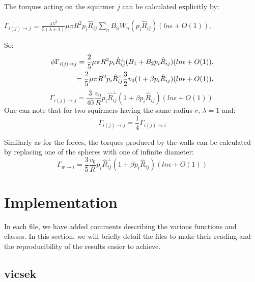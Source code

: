 \documentclass{article}
\begin{document}
The torques acting on the squirmer $j$ can be calculated explicitly by:
\begin{center}
    $\Gamma_{i(j)\rightarrow j}$ = $\frac{4 \lambda^2}{5(\lambda +1)} \mu \pi R^2 p_i\hat{R}_{ij}^{\perp}\sum_{n} B_n W_n(p_i\hat{R}_{ij}) (ln \epsilon + O(1))$.    
\end{center}
So:
\begin{align*}
    \footnotesize
    \phi \Gamma_{i(j)\rightarrow j} = \frac{2}{5}\mu\pi R^2p_i\hat{R}_{ij}^{\perp}(B_1 + B_2 p_i\hat{R}_{ij})(ln \epsilon + O(1)),\\
    = \frac{2}{5}\mu\pi R^2p_i\hat{R}_{ij}^{\perp}\frac{3}{2}v_0(1 + \beta p_i\hat{R}_{ij})(ln \epsilon + O(1)).
\end{align*}
\begin{equation*}
    \boxed{\Gamma_{i(j)\rightarrow j} = \frac{3}{40}\frac{v_0}{R}p_i\hat{R}_{ij}^{\perp}(1 + \beta p_i\hat{R}_{ij})(ln \epsilon + O(1))}.
\end{equation*}
One can note that for two squirmers having the same radius $r$, $\lambda = 1$ and:
$$\Gamma_{i(j)\rightarrow j} = \frac{1}{4}\Gamma_{i(j)\rightarrow i}$$

Similarly as for the forces, the torques produced by the walls can be calculated by replacing one of the spheres with one of infinite diameter:
\begin{equation*}
    \boxed{\Gamma_{w\rightarrow i} = \frac{3}{5} \frac{v_0}{R}p_i\hat{R}_{ij}^{\perp}(1 + \beta p_i\hat{R}_{ij})(ln \epsilon + O(1))}
\end{equation*}


\newpage
\section{Implementation}
In each file, we have added comments describing the various functions and classes. In this section, 
we will briefly detail the files to make their reading and the reproducibility of the results easier to achieve.
\subsection*{vicsek}
\end{document}
